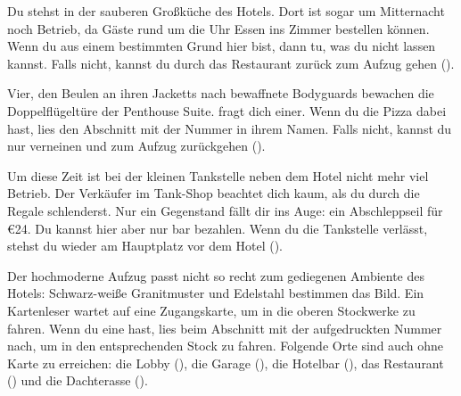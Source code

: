 {	%
	 Du stehst in der sauberen Großküche des Hotels. Dort ist sogar um Mitternacht noch Betrieb, da Gäste rund um die Uhr Essen ins Zimmer bestellen können. Wenn du aus einem bestimmten Grund hier bist, dann tu, was du nicht lassen kannst. Falls nicht, kannst du durch das Restaurant zurück zum Aufzug gehen ().

		 Vier, den Beulen an ihren Jacketts nach bewaffnete Bodyguards bewachen die Doppelflügeltüre der Penthouse Suite.  fragt dich einer. Wenn du die Pizza dabei hast, lies den Abschnitt mit der Nummer in ihrem Namen. Falls nicht, kannst du nur verneinen und zum Aufzug zurückgehen ().

		 Um diese Zeit ist bei der kleinen Tankstelle neben dem Hotel nicht mehr viel Betrieb. Der Verkäufer im Tank-Shop beachtet dich kaum, als du durch die Regale schlenderst. Nur ein Gegenstand fällt dir ins Auge: ein Abschleppseil für €24. Du kannst hier aber nur bar bezahlen. Wenn du die Tankstelle verlässt, stehst du wieder am Hauptplatz vor dem Hotel ().

		 Der hochmoderne Aufzug passt nicht so recht zum gediegenen Ambiente des Hotels: Schwarz-weiße Granitmuster und Edelstahl bestimmen das Bild. Ein Kartenleser wartet auf eine Zugangskarte, um in die oberen Stockwerke zu fahren. Wenn du eine hast, lies beim Abschnitt mit der aufgedruckten Nummer nach, um in den entsprechenden Stock zu fahren. Folgende Orte sind auch ohne Karte zu erreichen: die Lobby (), die Garage (), die Hotelbar (), das Restaurant () und die Dachterasse ().

}
